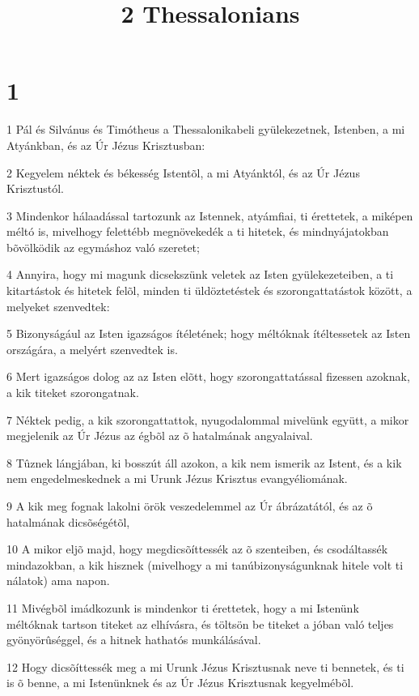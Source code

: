 

\title{2 Thessalonians}


\chapter{1}

\par 1 Pál és Silvánus és Timótheus a Thessalonikabeli gyülekezetnek, Istenben, a mi Atyánkban, és az Úr Jézus Krisztusban:
\par 2 Kegyelem néktek és békesség Istentõl, a mi Atyánktól, és az Úr Jézus Krisztustól.
\par 3 Mindenkor hálaadással tartozunk az Istennek, atyámfiai, ti érettetek, a miképen méltó is, mivelhogy felettébb megnövekedék a ti hitetek, és mindnyájatokban bõvölködik az egymáshoz való szeretet;
\par 4 Annyira, hogy mi magunk dicsekszünk veletek az Isten gyülekezeteiben, a ti kitartástok és hitetek felõl, minden ti üldöztetéstek és szorongattatástok között, a melyeket szenvedtek:
\par 5 Bizonyságául az Isten igazságos ítéletének; hogy méltóknak ítéltessetek az Isten országára, a melyért szenvedtek is.
\par 6 Mert igazságos dolog az az Isten elõtt, hogy szorongattatással fizessen azoknak, a kik titeket szorongatnak.
\par 7 Néktek pedig, a kik szorongattattok, nyugodalommal mivelünk együtt, a mikor megjelenik az Úr Jézus az égbõl az õ hatalmának angyalaival.
\par 8 Tûznek lángjában, ki bosszút áll azokon, a kik nem ismerik az Istent, és a kik nem engedelmeskednek a mi Urunk Jézus Krisztus evangyéliomának.
\par 9 A kik meg fognak lakolni örök veszedelemmel az Úr ábrázatától, és az õ hatalmának dicsõségétõl,
\par 10 A mikor eljõ majd, hogy megdicsõíttessék az õ szenteiben, és csodáltassék mindazokban, a kik hisznek (mivelhogy a mi tanúbizonyságunknak hitele volt ti nálatok) ama napon.
\par 11 Mivégbõl imádkozunk is mindenkor ti érettetek, hogy a mi Istenünk méltóknak tartson titeket az elhívásra, és töltsön be titeket a jóban való teljes gyönyörûséggel, és a hitnek hathatós munkálásával.
\par 12 Hogy dicsõíttessék meg a mi Urunk Jézus Krisztusnak neve ti bennetek, és ti is õ benne, a mi Istenünknek és az Úr Jézus Krisztusnak kegyelmébõl.

